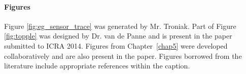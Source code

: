 \paragraph{Figures}
Figure \ref{fig:eg_sensor_trace} was generated by Mr. Troniak. Part of Figure \ref{fig:topple} was designed by Dr. van de Panne and is present in the paper submitted to ICRA 2014. 
Figures from Chapter~\ref{chap5} were developed collaboratively and are also present in the paper. Figures borrowed from the literature include appropriate references within the caption.
